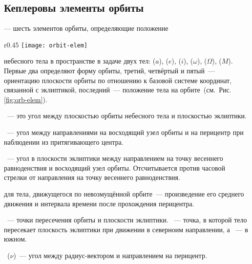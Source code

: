 \subsection{Кеплеровы элементы орбиты}

 --- шесть элементов орбиты, определяющие положение
\begin{wrapfigure}[14]{r}{0.45\tw}
	\centering
	\vspace{-1pc}
	\texttt{[image: orbit-elem]}
	\label{fig:orb-elem}
\end{wrapfigure}
небесного тела в пространстве в задаче двух тел:  ($a$),  ($e$),  ($i$),  ($\omega$),  ($\Omega$),  ($M$). Первые два определяют форму орбиты, третий, четвёртый и пятый~--- ориентацию плоскости орбиты по отношению к базовой системе координат, связанной с эклиптикой, последний~--- положение тела на орбите~(см.~Рис.\,\ref{fig:orb-elem}).

~--- это угол между плоскостью орбиты небесного тела и плоскостью эклиптики.

~--- угол между направлениями на восходящий узел орбиты и на перицентр при наблюдении из притягивающего центра.

~--- угол в плоскости эклиптики между направлением на точку весеннего равноденствия и восходящий узел орбиты. Отсчитывается против часовой стрелки от направления на точку весеннего равноденствия.

 для тела, движущегося по невозмущённой орбите~--- произведение его среднего движения и интервала времени после прохождения перицентра.

~--- точки пересечения орбиты и плоскости эклиптики. ~--- точка, в которой тело пересекает плоскость эклиптики при движении в северноим направлении, а ~--- в южном.

~($\nu$)~--- угол между радиус-вектором и направлением на перицентр.
